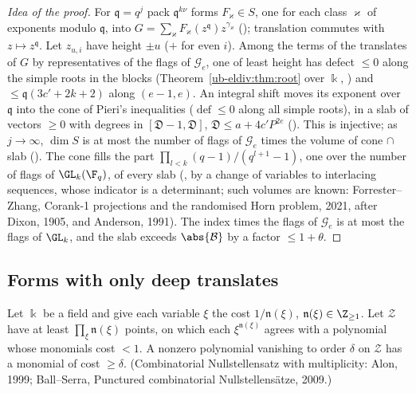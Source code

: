 \begin{proof}[Idea of the proof]
For $\mathfrak q=q^j$ pack $\mathfrak q^{k\nu}$ forms $F_\varkappa\in S$, one for each class
$\varkappa$ of exponents modulo $\mathfrak q$, into $G=\sum_\varkappa F_\varkappa(z^{\mathfrak
q})z^{\gamma_\varkappa}$ (); translation commutes with $z\mapsto z^{\mathfrak
q}$. Let $z_{u,i}$ have height $\pm u$ ($+$ for even $i$). Among the terms of the translates of $G$ by
representatives of the flags of $\mathcal G_e$, one of least height has defect $\le0$ along the simple
roots in the blocks (Theorem~\ref{ub-eldiv:thm:root} over $\Bbbk$,
) and $\le\mathfrak q(3c'+2k+2)$ along
$(e-1,e)$. An integral shift moves its exponent over $\mathfrak q$ into the cone of Pieri's
inequalities ($\operatorname{def}\le0$ along all simple roots), in a slab of vectors $\ge0$ with
degrees in $[\mathfrak D-1,\mathfrak D]$, $\mathfrak D\le a+4c'P^{2e}$
(). This is injective; as $j\to\infty$,
$\dim S$ is at most the number of flags of $\mathcal G_e$ times the volume of cone $\cap$ slab
(). The cone fills the part
$\prod_{l<k}(q-1)/(q^{l+1}-1)$, one over the number of flags of $\GL_k(\F_q)$, of every slab
(, by a change of variables to interlacing sequences,
whose indicator is a determinant; such volumes are known: Forrester--Zhang, Corank-1 projections and
the randomised Horn problem, 2021, after Dixon, 1905, and Anderson, 1991). The index times the flags
of $\mathcal G_e$ is at most the flags of $\GL_k$, and the slab exceeds $\abs{\mathcal B}$ by a factor
$\le1+\theta$.
\end{proof}

\subsection{Forms with only deep translates}\label{ub-eldiv:sec:depth}

\begin{fact}\label{ub-eldiv:fact:cn}
Let $\Bbbk$ be a field and give each variable $\xi$ the cost $1/\mathfrak n(\xi)$, $\mathfrak n(\xi)\in\Z_{\ge1}$.
Let $\mathcal Z$ have at least $\prod_\xi\mathfrak n(\xi)$ points, on which each $\xi^{\mathfrak n(\xi)}$
agrees with a polynomial whose monomials cost $<1$. A nonzero polynomial vanishing to order
$\delta$ on $\mathcal Z$ has a monomial of cost $\ge\delta$. (Combinatorial Nullstellensatz with
multiplicity: Alon, 1999; Ball--Serra, Punctured combinatorial Nullstellens\"atze, 2009.)
\end{fact}

